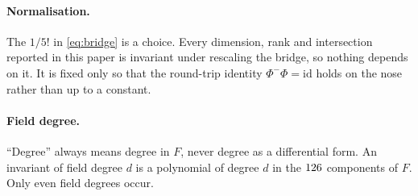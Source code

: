 \paragraph{Normalisation.}
The $1/5!$ in \eqref{eq:bridge} is a choice. Every dimension, rank and
intersection reported in this paper is invariant under rescaling the bridge, so
nothing depends on it. It is fixed only so that the round-trip identity
$\Phi^-\Phi = \mathrm{id}$ holds on the nose rather than up to a constant.

\paragraph{Field degree.}
``Degree'' always means degree in $F$, never degree as a differential form. An
invariant of field degree $d$ is a polynomial of degree $d$ in the
$126$ components of $F$. Only even field degrees occur.
